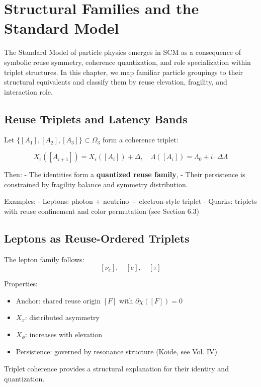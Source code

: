 \chapter{Structural Families and the Standard Model} \label{chapter-structural-families}

The Standard Model of particle physics emerges in SCM as a consequence of symbolic reuse symmetry, coherence quantization, and role specialization within triplet structures. In this chapter, we map familiar particle groupings to their structural equivalents and classify them by reuse elevation, fragility, and interaction role.

\section{Reuse Triplets and Latency Bands} \label{sec:reuse-families}

Let $\{[A_1], [A_2], [A_3]\} \subset \Omega_3$ form a coherence triplet:

\[
X_\epsilon([A_{i+1}]) = X_\epsilon([A_i]) + \Delta,\quad \Lambda([A_i]) = \Lambda_0 + i \cdot \Delta\Lambda
\]

Then:
- The identities form a \textbf{quantized reuse family},
- Their persistence is constrained by fragility balance and symmetry distribution.

Examples:
- Leptons: photon + neutrino + electron-style triplet
- Quarks: triplets with reuse confinement and color permutation (see Section 6.3)

\section{Leptons as Reuse-Ordered Triplets} \label{sec:leptons}

The lepton family follows:
\[
[\nu_e],\quad [e],\quad [\tau]
\]

Properties:
\begin{itemize}
  \item Anchor: shared reuse origin $[F]$ with $\partial\chi([F]) = 0$
  \item $X_\pi$: distributed asymmetry
  \item $X_\phi$: increases with elevation
  \item Persistence: governed by resonance structure (Koide, see Vol. IV)
\end{itemize}

Triplet coherence provides a structural explanation for their identity and quantization.

